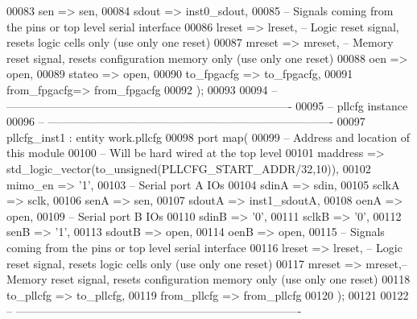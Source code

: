 \begin{DoxyCode}
00083       sen         => sen,
00084       sdout       => inst0_sdout,  
00085 \textcolor{keyword}{      -- Signals coming from the pins or top level serial interface}
00086       lreset      => lreset,\textcolor{keyword}{   -- Logic reset signal, resets logic cells only  (use only one reset)}
00087       mreset      => mreset,\textcolor{keyword}{   -- Memory reset signal, resets configuration memory only (use only one
       reset)      }
00088       oen         => \textcolor{keywordflow}{open},
00089       stateo      => \textcolor{keywordflow}{open},      
00090       to\_fpgacfg  => to_fpgacfg,
00091       from\_fpgacfg=> from_fpgacfg
00092    \textcolor{vhdlchar}{)};
00093    
00094 \textcolor{keyword}{-- ----------------------------------------------------------------------------}
00095 \textcolor{keyword}{-- pllcfg instance}
00096 \textcolor{keyword}{-- ----------------------------------------------------------------------------  }
00097    pllcfg\_inst1 : \textcolor{keywordflow}{entity} work.pllcfg
00098    \textcolor{keywordflow}{port} \textcolor{keywordflow}{map}(
00099 \textcolor{keyword}{      -- Address and location of this module}
00100 \textcolor{keyword}{      -- Will be hard wired at the top level}
00101       maddress       => \textcolor{comment}{std\_logic\_vector}\textcolor{vhdlchar}{(}to\_unsigned\textcolor{vhdlchar}{(}PLLCFG\_START\_ADDR/32,\textcolor{vhdllogic}{10}\textcolor{vhdlchar}{)}\textcolor{vhdlchar}{)},
00102       mimo_en        => '1',      
00103 \textcolor{keyword}{      -- Serial port A IOs}
00104       sdinA          => sdin,
00105       sclkA          => sclk,
00106       senA           => sen,
00107       sdoutA         => inst1_sdoutA,    
00108       oenA           => \textcolor{keywordflow}{open},     
00109 \textcolor{keyword}{      -- Serial port B IOs}
00110       sdinB          => '0',
00111       sclkB          => '0',
00112       senB           => '1',
00113       sdoutB         => \textcolor{keywordflow}{open},    
00114       oenB           => \textcolor{keywordflow}{open},       
00115 \textcolor{keyword}{      -- Signals coming from the pins or top level serial interface}
00116       lreset         => lreset,\textcolor{keyword}{ -- Logic reset signal, resets logic cells only  (use only one reset)}
00117       mreset         => mreset,\textcolor{keyword}{-- Memory reset signal, resets configuration memory only (use only one
       reset)      }
00118       to\_pllcfg      => to_pllcfg,
00119       from\_pllcfg    => from_pllcfg
00120    \textcolor{vhdlchar}{)};
00121    
00122 \textcolor{keyword}{-- ----------------------------------------------------------------------------}

\end{DoxyCode}
